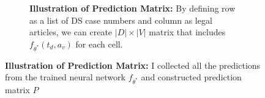 \begin{figure}[!tbp]
\begin{subfigure}[b]{0.49\textwidth}
{\begin{tikzpicture}
      \end{tikzpicture}
    }
    \label{fig:illutrate-preds}
    \caption{\textbf{Illustration of Prediction Matrix:} By defining row as a list of DS case numbers and column as legal articles, we can create $|D| \times |V|$ matrix that includes $f_{\theta^*}(t_d, a_v)$ for each cell.}
  \end{subfigure}
  \hfill
  \begin{subfigure}[b]{0.49\textwidth}
  \end{subfigure}
  \caption{\textbf{Illustration of Prediction Matrix:} I collected all the predictions from the trained neural network $f_{\theta^*}$ and constructed prediction matrix $P$}
  \label{fig:illutrate-preds}
\end{figure}
